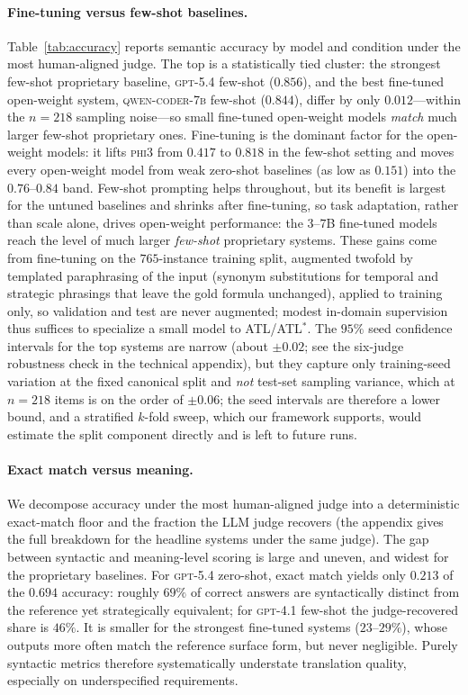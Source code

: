 \paragraph{Fine-tuning versus few-shot baselines.}
Table~\ref{tab:accuracy} reports semantic accuracy by model and condition under the most human-aligned judge. The top is a statistically tied cluster: the strongest few-shot proprietary baseline, \textsc{gpt-5.4} few-shot ($0.856$), and the best fine-tuned open-weight system, \textsc{qwen-coder-7b} few-shot ($0.844$), differ by only $0.012$---within the $n{=}218$ sampling noise---so small fine-tuned open-weight models \emph{match} much larger few-shot proprietary ones. Fine-tuning is the dominant factor for the open-weight models: it lifts \textsc{phi3} from $0.417$ to $0.818$ in the few-shot setting and moves every open-weight model from weak zero-shot baselines (as low as $0.151$) into the $0.76$--$0.84$ band. Few-shot prompting helps throughout, but its benefit is largest for the untuned baselines and shrinks after fine-tuning, so task adaptation, rather than scale alone, drives open-weight performance: the $3$--$7$B fine-tuned models reach the level of much larger \emph{few-shot} proprietary systems. These gains come from fine-tuning on the $765$-instance training split, augmented twofold by templated paraphrasing of the input (synonym substitutions for temporal and strategic phrasings that leave the gold formula unchanged), applied to training only, so validation and test are never augmented; modest in-domain supervision thus suffices to specialize a small model to ATL/ATL$^\ast$. The $95\%$ seed confidence intervals for the top systems are narrow (about $\pm0.02$; see the six-judge robustness check in the technical appendix), but they capture only training-seed variation at the fixed canonical split and \emph{not} test-set sampling variance, which at $n{=}218$ items is on the order of $\pm0.06$; the seed intervals are therefore a lower bound, and a stratified $k$-fold sweep, which our framework supports, would estimate the split component directly and is left to future runs.

\paragraph{Exact match versus meaning.}
We decompose accuracy under the most human-aligned judge into a deterministic exact-match floor and the fraction the LLM judge recovers (the appendix gives the full breakdown for the headline systems under the same judge). The gap between syntactic and meaning-level scoring is large and uneven, and widest for the proprietary baselines. For \textsc{gpt-5.4} zero-shot, exact match yields only $0.213$ of the $0.694$ accuracy: roughly $69\%$ of correct answers are syntactically distinct from the reference yet strategically equivalent; for \textsc{gpt-4.1} few-shot the judge-recovered share is $46\%$. It is smaller for the strongest fine-tuned systems ($23$--$29\%$), whose outputs more often match the reference surface form, but never negligible. Purely syntactic metrics therefore systematically understate translation quality, especially on underspecified requirements.

